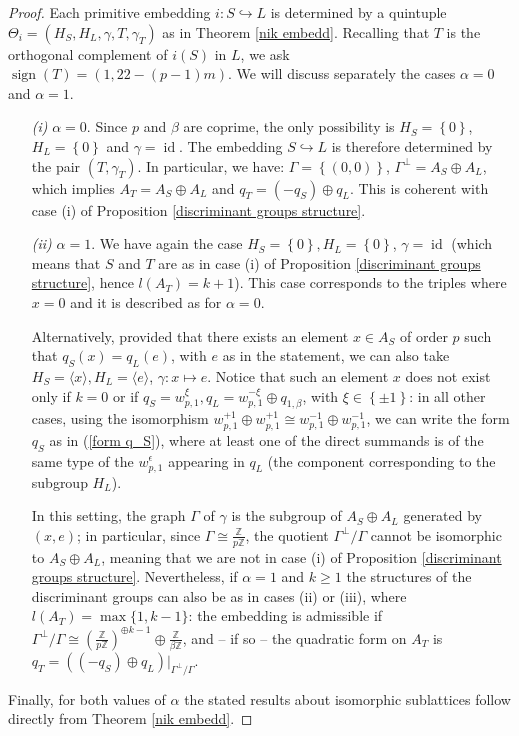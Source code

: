\documentclass{amsart}
\theoremstyle{definition}
\newcommand{\IZ}{\mathbb{Z}}
\DeclareMathOperator{\id}{id}
\DeclareMathOperator{\signt}{sign}
\begin{document}
\begin{proof}
Each primitive embedding $i: S \hookrightarrow L$ is determined by a quintuple $\Theta_i = (H_S, H_L, \gamma, T, \gamma_T)$ as in Theorem \ref{nik embedd}. Recalling that $T$ is the orthogonal complement of $i(S)$ in $L$, we ask  $\signt(T) = (1, 22 - (p-1)m)$. We will discuss separately the cases $\alpha= 0$ and $\alpha = 1$.
\begin{enumerate}
\item[\textit{(i)}] $\alpha = 0$. Since $p$ and $\beta$ are coprime, the only possibility is $H_S = \left\{ 0 \right\}$, $H_L = \left\{ 0 \right\}$ and $\gamma = \id$. The embedding $S \hookrightarrow L$ is therefore determined by the pair $(T, \gamma_T)$. In particular, we have: $\Gamma = \left\{ (0,0) \right\}$, $\Gamma^\perp = A_S \oplus A_L$, which implies $A_T = A_S \oplus A_L$ and $q_T = (-q_S) \oplus q_L$. This is coherent with case (i) of Proposition \ref{discriminant groups structure}.

\item[\textit{(ii)}] $\alpha = 1$. We have again the case $H_S = \left\{ 0 \right\}, H_L = \left\{ 0 \right\}$, $\gamma = \id$ (which means that $S$ and $T$ are as in case (i) of Proposition \ref{discriminant groups structure}, hence $l(A_T) = k+1$). This case corresponds to the triples where $x=0$ and it is described as for $\alpha = 0$.

Alternatively, provided that there exists an element $x \in A_S$ of order $p$ such that $q_S(x)= q_L(e)$, with $e$ as in the statement, we can also take $H_S = \langle x\rangle, H_L = \langle e \rangle$, $\gamma: x \mapsto e$. Notice that such an element $x$ does not exist only if $k=0$ or if $q_S =w^{\xi}_{p,1}, q_L=w^{-\xi}_{p,1} \oplus q_{1, \beta}$, with $\xi \in \left\{ \pm 1\right\}$: in all other cases, using the isomorphism $w^{+1}_{p,1} \oplus w^{+1}_{p,1} \cong w^{-1}_{p,1} \oplus w^{-1}_{p,1}$, we can write the form $q_S$ as in (\ref{form q_S}), where at least one of the direct summands is of the same type of the $w^{\epsilon}_{p,1}$ appearing in $q_L$ (the component corresponding to the subgroup $H_L$).

In this setting, the graph $\Gamma$ of $\gamma$ is the subgroup of $A_S \oplus A_L$ generated by $(x,e)$; in particular, since $\Gamma \cong \frac{\IZ}{p \IZ}$, the quotient $\Gamma^\perp/\Gamma$ cannot be isomorphic to $A_S \oplus A_L$, meaning that we are not in case (i) of Proposition \ref{discriminant groups structure}. Nevertheless, if $\alpha = 1$ and $k \geq 1$ the structures of the discriminant groups can also be as in cases (ii) or (iii), where $l(A_T) = \max\{1,k-1\}$: the embedding is admissible if $\Gamma^\perp/\Gamma \cong \left( \frac{\IZ}{p \IZ}\right)^{\oplus k-1} \oplus \frac{\IZ}{\beta \IZ}$, and -- if so -- the quadratic form on $A_T$ is $q_T = ((-q_S)\oplus q_L)\rvert_{\Gamma^\perp/\Gamma}$.
\end{enumerate} 

Finally, for both values of $\alpha$ the stated results about isomorphic sublattices follow directly from Theorem \ref{nik embedd}.
\end{proof}
\end{document}
